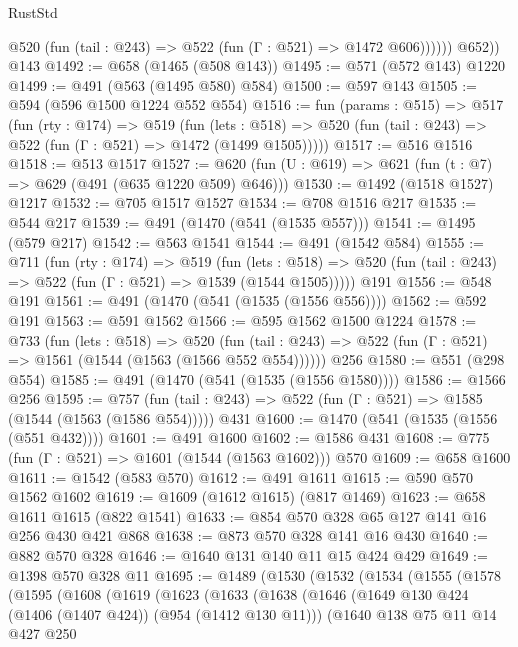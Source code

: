 \begin{lexlean}{RustStd}
\begin{coremodule}
              @520 (fun (tail : @243) => @522 (fun (Γ : @521) => @1472 @606))))))
        @652))
    @143
@1492 := @658 (@1465 (@508 @143))
@1495 := @571 (@572 @143) @1220
@1499 := @491 (@563 (@1495 @580) @584)
@1500 := @597 @143
@1505 := @594 (@596 @1500 @1224 @552 @554)
@1516 := fun (params : @515) =>
  @517
    (fun (rty : @174) =>
    @519
      (fun (lets : @518) =>
      @520 (fun (tail : @243) => @522 (fun (Γ : @521) => @1472 (@1499 @1505)))))
@1517 := @516 @1516
@1518 := @513 @1517
@1527 := @620 (fun (U : @619) => @621 (fun (t : @7) => @629 (@491 (@635 @1220 @509) @646)))
@1530 := @1492 (@1518 @1527) @1217
@1532 := @705 @1517 @1527
@1534 := @708 @1516 @217
@1535 := @544 @217
@1539 := @491 (@1470 (@541 (@1535 @557)))
@1541 := @1495 (@579 @217)
@1542 := @563 @1541
@1544 := @491 (@1542 @584)
@1555 := @711
    (fun (rty : @174) =>
    @519
      (fun (lets : @518) =>
      @520 (fun (tail : @243) => @522 (fun (Γ : @521) => @1539 (@1544 @1505)))))
    @191
@1556 := @548 @191
@1561 := @491 (@1470 (@541 (@1535 (@1556 @556))))
@1562 := @592 @191
@1563 := @591 @1562
@1566 := @595 @1562 @1500 @1224
@1578 := @733
    (fun (lets : @518) =>
    @520 (fun (tail : @243) => @522 (fun (Γ : @521) => @1561 (@1544 (@1563 (@1566 @552 @554))))))
    @256
@1580 := @551 (@298 @554)
@1585 := @491 (@1470 (@541 (@1535 (@1556 @1580))))
@1586 := @1566 @256
@1595 := @757
    (fun (tail : @243) => @522 (fun (Γ : @521) => @1585 (@1544 (@1563 (@1586 @554)))))
    @431
@1600 := @1470 (@541 (@1535 (@1556 (@551 @432))))
@1601 := @491 @1600
@1602 := @1586 @431
@1608 := @775 (fun (Γ : @521) => @1601 (@1544 (@1563 @1602))) @570
@1609 := @658 @1600
@1611 := @1542 (@583 @570)
@1612 := @491 @1611
@1615 := @590 @570 @1562 @1602
@1619 := @1609 (@1612 @1615) (@817 @1469)
@1623 := @658 @1611 @1615 (@822 @1541)
@1633 := @854 @570 @328 @65 @127 @141 @16 @256 @430 @421 @868
@1638 := @873 @570 @328 @141 @16 @430
@1640 := @882 @570 @328
@1646 := @1640 @131 @140 @11 @15 @424 @429
@1649 := @1398 @570 @328 @11
@1695 := @1489
    (@1530
      (@1532
        (@1534
          (@1555
            (@1578
              (@1595
                (@1608
                  (@1619
                    (@1623
                      (@1633
                        (@1638
                          (@1646
                            (@1649 @130 @424 (@1406 (@1407 @424)) (@954 (@1412 @130 @11)))
                            (@1640
                              @138
                              @75
                              @11
                              @14
                              @427
                              @250

\end{coremodule}
\end{lexlean}
